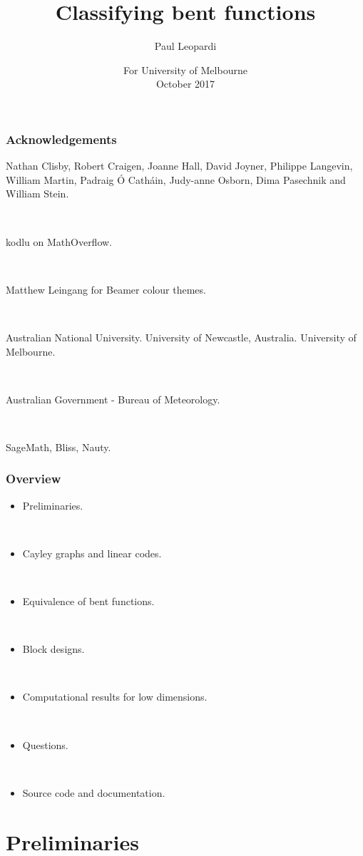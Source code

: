 \documentclass[pdf,sprung,slideColor,nocolorBG]{beamer}
\title{Classifying bent functions}
\author{Paul Leopardi}
\date{For University of Melbourne
\\
October 2017}
\institute{University of Melbourne
\\
Australian Government - Bureau of Meteorology}
\begin{document}
\frame{\titlepage}
\begin{frame}
\frametitle{Acknowledgements}
\begin{center}
Nathan Clisby,
Robert Craigen,
Joanne Hall,
David Joyner, Philippe Langevin, William Martin,
Padraig {\'O} Cath{\'a}in,
Judy-anne Osborn, Dima Pasechnik and William Stein.

~

kodlu on MathOverflow.

~

Matthew Leingang for Beamer colour themes.

~

Australian National University. University of Newcastle, Australia. University of Melbourne.

~

Australian Government - Bureau of Meteorology.

~

SageMath, Bliss, Nauty.
\end{center}
\end{frame}

\begin{frame}
\frametitle{Overview}
\begin{itemize}
\item
Preliminaries.

~

\item
Cayley graphs and linear codes.

~

\item
Equivalence of bent functions.

~

\item
Block designs.

~

\item
Computational results for low dimensions.

~

\item
Questions.

~

\item
Source code and documentation.
\end{itemize}

\end{frame}

\section{Preliminaries}
\end{document}
